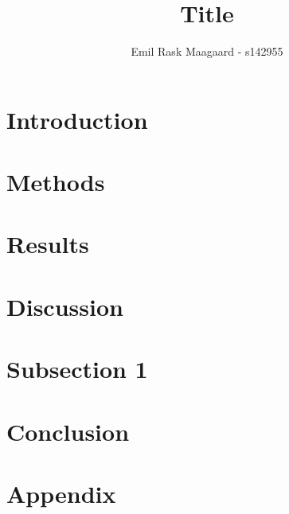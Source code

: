 \documentclass{dtu_report_columns}
\title{Title}
\author{Emil Rask Maagaard - s142955}
\begin{document}
\maketitle{}




\section{Introduction}


\section{Methods}


\section{Results}


\section{Discussion}


\section{Subsection 1}


\section{Conclusion}


\section{Appendix}

\end{document}
